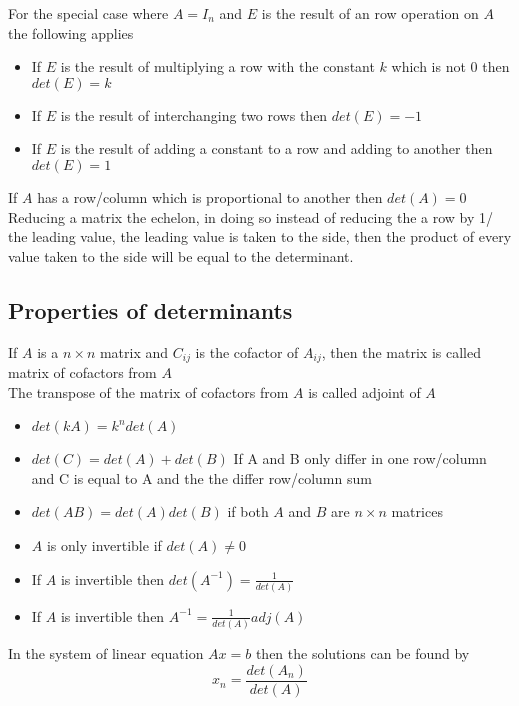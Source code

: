 \documentclass[12pt, a4paper]{article}
\begin{document}
			For the special case where $A=I_n$ and $E$ is the result of an row operation on $A$ the following applies
			\begin{itemize}
				\item If $E$ is the result of multiplying a row with the constant $k$ which is not 0 then $det(E)=k$
				\item If $E$ is the result of interchanging two rows then $det(E)=-1$
				\item If $E$ is the result of adding a constant to a row and adding to another then $det(E)=1$
			\end{itemize}
			If $A$ has a row/column which is proportional to another then $det(A)=0$\\
			Reducing a matrix the echelon, in doing so instead of reducing the a row by 1/ the leading value, the leading value is taken to the side, then the product of every value taken to the side will be equal to the determinant.\\
		\subsection{Properties of determinants}
			If $A$ is a $n\times n$ matrix and $C_{ij}$ is the cofactor of $A_{ij}$, then the matrix is called matrix of cofactors from $A$\\
			The transpose of the matrix of cofactors from $A$ is called adjoint of $A$
			\begin{itemize}
				\item $det(kA)=k^ndet(A)$
				\item $det(C)=det(A)+det(B)$  If A and B only differ in one row/column and C is equal to A and the the differ row/column sum
				\item $det(AB)=det(A)det(B)$ if both $A$ and $B$ are $n\times n$ matrices
				\item $A$ is only invertible if $det(A)\neq 0$
				\item If $A$ is invertible then $det(A^{-1})=\frac{1}{det(A)}$
				\item If $A$ is invertible then $A^{-1}=\frac{1}{det(A)}adj(A)$
			\end{itemize}
			In the system of linear equation $Ax=b$ then the solutions can be found by
			$$x_n=\frac{det(A_n)}{det(A)}$$
\end{document}
